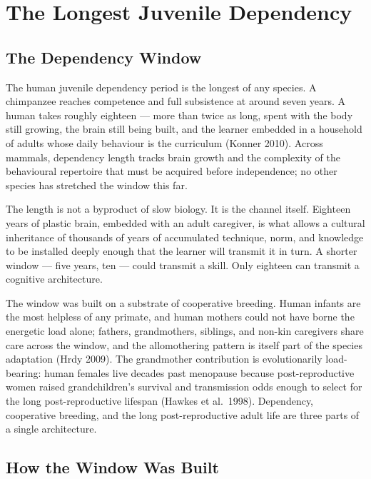 \documentclass[12pt,letterpaper]{article}
\begin{document}
\section{The Longest Juvenile Dependency}\label{longest-juvenile-dependency}

\subsection{The Dependency Window}\label{the-dependency-window}

The human juvenile dependency period is the longest of any species.
A chimpanzee reaches competence and full subsistence at around seven
years. A human takes roughly eighteen --- more than twice as long,
spent with the body still growing, the brain still being built, and
the learner embedded in a household of adults whose daily behaviour
is the curriculum (Konner 2010). Across mammals, dependency length
tracks brain growth and the complexity of the behavioural repertoire
that must be acquired before independence; no other species has
stretched the window this far.

The length is not a byproduct of slow biology. It is the channel
itself. Eighteen years of plastic brain, embedded with an adult
caregiver, is what allows a cultural inheritance of thousands of
years of accumulated technique, norm, and knowledge to be installed
deeply enough that the learner will transmit it in turn. A shorter
window --- five years, ten --- could transmit a skill. Only eighteen
can transmit a cognitive architecture.

The window was built on a substrate of cooperative breeding. Human
infants are the most helpless of any primate, and human mothers could
not have borne the energetic load alone; fathers, grandmothers,
siblings, and non-kin caregivers share care across the window, and
the allomothering pattern is itself part of the species adaptation
(Hrdy 2009). The grandmother contribution is evolutionarily
load-bearing: human females live decades past menopause because
post-reproductive women raised grandchildren's survival and
transmission odds enough to select for the long post-reproductive
lifespan (Hawkes et al.\ 1998). Dependency, cooperative breeding, and
the long post-reproductive adult life are three parts of a single
architecture.

\subsection{How the Window Was Built}\label{how-the-window-was-built}
\end{document}
